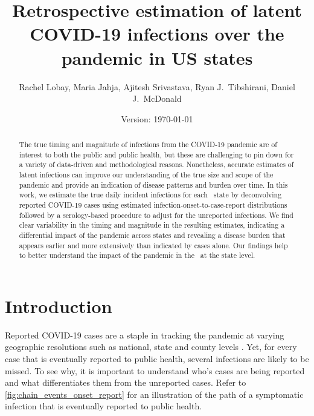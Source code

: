 \documentclass{article}
\begin{document}
\title{Retrospective estimation of latent COVID-19 infections over the pandemic in US states}
\author{Rachel Lobay, Maria Jahja, Ajitesh Srivastava, Ryan J.\ Tibshirani, Daniel J.\ McDonald}
\date{Version: \today}
\maketitle

\begin{abstract}
The true timing and magnitude of infections from the COVID-19 pandemic are of
interest to both the public and public health, but these are challenging to pin
down for a variety of data-driven and methodological reasons. Nonetheless, 
accurate estimates
of latent infections can improve our understanding of the true size and
scope of the pandemic and provide an indication of disease patterns and burden
over time. In this work, we estimate the true daily incident infections for each
\US\ state by deconvolving reported COVID-19 cases using estimated
infection-onset-to-case-report distributions followed by a serology-based
procedure to adjust for the unreported infections. We find clear
variability in the timing and magnitude in the resulting estimates, indicating a
differential impact of the pandemic across states and revealing a disease burden
that appears earlier and more extensively than indicated by cases alone. Our
findings help to better understand the impact of the pandemic in the \US\ at the state level.
\end{abstract}

\section{Introduction}

Reported COVID-19 cases are a staple in tracking the pandemic at varying
geographic resolutions such as national, state and county levels
\citep{dong2020interactive, nyt2020corona, wp2020tracking}. Yet, for every case
that is eventually reported to public health, several infections are likely to
be missed. To see why, it is important to understand who's cases are being reported and
 what differentiates them from the unreported cases. Refer to
\autoref{fig:chain_events_onset_report} for an illustration of the path of a
symptomatic infection that is eventually reported to public health. 
\end{document}
